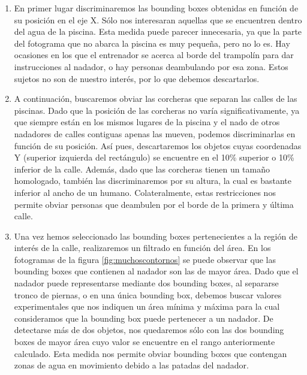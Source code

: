 \begin{enumerate}
    \item En primer lugar discriminaremos las bounding boxes obtenidas en función de su posición en el eje X. Sólo nos interesaran aquellas que se encuentren dentro del agua de la piscina. Esta medida puede parecer innecesaria, ya que la parte del fotograma que no abarca la piscina es muy pequeña, pero no lo es. Hay ocasiones en los que el entrenador se acerca al borde del trampolín para dar instrucciones al nadador, o hay personas deambulando por esa zona. Estos sujetos no son de nuestro interés, por lo que debemos descartarlos. 
    \item A continuación, buscaremos obviar las corcheras que separan las calles de las piscinas. Dado que la posición de las corcheras no varía significativamente, ya que siempre están en los mismos lugares de la piscina y el nado de otros nadadores de calles contiguas apenas las mueven, podemos discriminarlas en función de su posición. Así pues, descartaremos los objetos cuyas coordenadas Y (superior izquierda del rectángulo) se encuentre en el 10\% superior o 10\% inferior de la calle. Además, dado que las corcheras tienen un tamaño homologado, también las discriminaremos por su altura, la cual es bastante inferior al ancho de un humano. Colateralmente, estas restricciones nos permite obviar personas que deambulen por el borde de la primera y última calle.
    \item Una vez hemos seleccionado las bounding boxes pertenecientes a la región de interés de la calle, realizaremos un filtrado en función del área. En los fotogramas de la figura \ref{fig:muchoscontornos} se puede observar que las bounding boxes que contienen al nadador son las de mayor área. Dado que el nadador puede representarse mediante dos bounding boxes, al separarse tronco de piernas, o en una única bounding box, debemos buscar valores experimentales que nos indiquen un área mínima y máxima para la cual consideramos que la bounding box puede pertenecer a un nadador. De detectarse más de dos objetos, nos quedaremos sólo con las dos bounding boxes de mayor área cuyo valor se encuentre en el rango anteriormente calculado. Esta medida nos permite obviar bounding boxes que contengan zonas de agua en movimiento debido a las patadas del nadador.
    

\end{enumerate}

